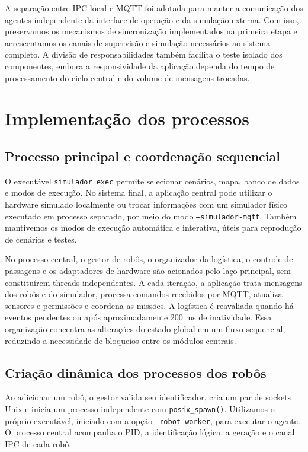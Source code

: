\documentclass[12pt,a4paper]{article}
\newcommand{\code}[1]{\mbox{\texttt{#1}}}
\begin{document}
A separação entre IPC local e MQTT foi adotada para manter a comunicação dos
agentes independente da interface de operação e da simulação externa. Com isso,
preservamos os mecanismos de sincronização implementados na primeira etapa e
acrescentamos os canais de supervisão e simulação necessários ao sistema
completo. A divisão de responsabilidades também facilita o teste isolado dos
componentes, embora a responsividade da aplicação dependa do tempo de
processamento do ciclo central e do volume de mensagens trocadas.

\section{Implementação dos processos}
\subsection{Processo principal e coordenação sequencial}
O executável \code{simulador\_exec} permite selecionar cenários, mapa, banco de
dados e modos de execução. No sistema final, a aplicação central pode utilizar
o hardware simulado localmente ou trocar informações com um simulador físico
executado em processo separado, por meio do modo \code{--simulador-mqtt}.
Também mantivemos os modos de execução automática e interativa, úteis para
reprodução de cenários e testes.

No processo central, o gestor de robôs, o organizador da logística, o controle
de passagens e os adaptadores de hardware são acionados pelo laço principal,
sem constituírem threads independentes. A cada iteração, a aplicação trata
mensagens dos robôs e do simulador, processa comandos recebidos por MQTT,
atualiza sensores e permissões e coordena as missões. A logística é reavaliada
quando há eventos pendentes ou após aproximadamente 200 ms de inatividade. Essa
organização concentra as alterações do estado global em um fluxo sequencial,
reduzindo a necessidade de bloqueios entre os módulos centrais.

\subsection{Criação dinâmica dos processos dos robôs}
Ao adicionar um robô, o gestor valida seu identificador, cria um par de sockets
Unix e inicia um processo independente com \code{posix\_spawn()}. Utilizamos o
próprio executável, iniciado com a opção \code{--robot-worker}, para executar o
agente. O processo central acompanha o PID, a identificação lógica, a geração e
o canal IPC de cada robô.
\end{document}
